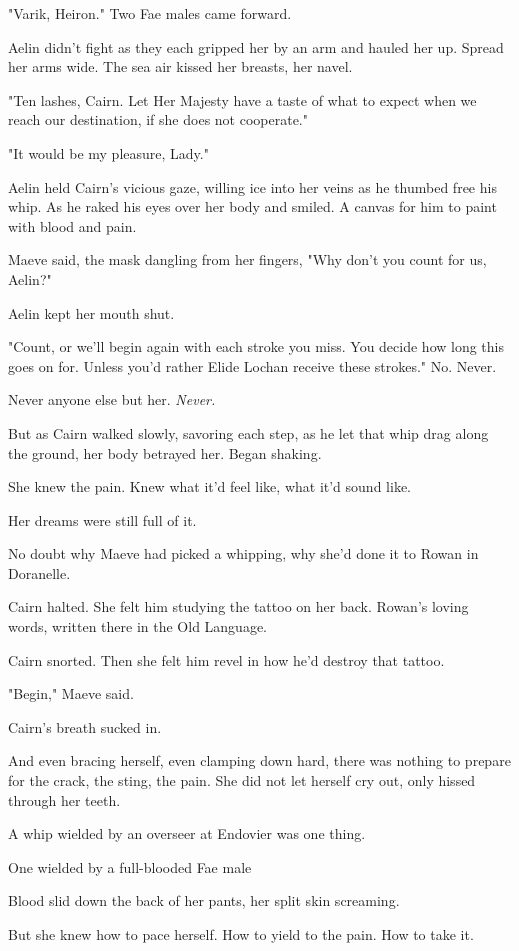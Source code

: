 "Varik, Heiron."
Two Fae males came forward.

Aelin didn't fight as they each gripped her by an arm and hauled her up.
Spread her arms wide.
The sea air kissed her breasts, her navel.

"Ten lashes, Cairn.
Let Her Majesty have a taste of what to expect when we reach our destination, if she does not cooperate."

"It would be my pleasure, Lady."

Aelin held Cairn's vicious gaze, willing ice into her veins as he thumbed free his whip.
As he raked his eyes over her body and smiled.
A canvas for him to paint with blood and pain.

Maeve said, the mask dangling from her fingers, "Why don't you count for us, Aelin?"

Aelin kept her mouth shut.

"Count, or we'll begin again with each stroke you miss.
You decide how long this goes on for.
Unless you'd rather Elide Lochan receive these strokes."
No.
Never.

Never anyone else but her.
\emph{Never.}

But as Cairn walked slowly, savoring each step, as he let that whip drag along the ground, her body betrayed her.
Began shaking.

She knew the pain.
Knew what it'd feel like, what it'd sound like.

Her dreams were still full of it.

No doubt why Maeve had picked a whipping, why she'd done it to Rowan in Doranelle.

Cairn halted.
She felt him studying the tattoo on her back.
Rowan's loving words, written there in the Old Language.

Cairn snorted.
Then she felt him revel in how he'd destroy that tattoo.

"Begin," Maeve said.

Cairn's breath sucked in.

And even bracing herself, even clamping down hard, there was nothing to prepare for the crack, the sting, the pain.
She did not let herself cry out, only hissed through her teeth.

A whip wielded by an overseer at Endovier was one thing.

One wielded by a full-blooded Fae male 

Blood slid down the back of her pants, her split skin screaming.

But she knew how to pace herself.
How to yield to the pain.
How to take it.

